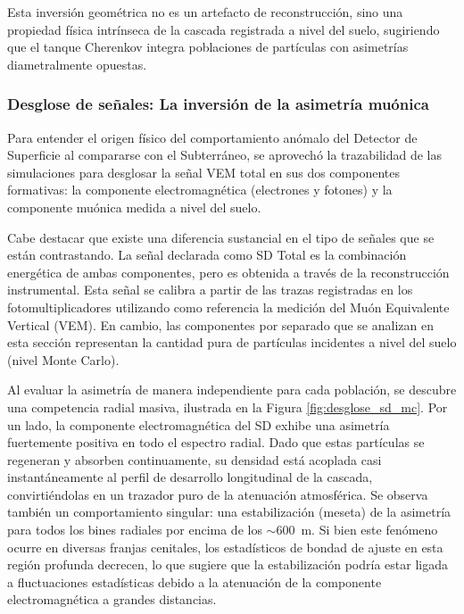 Esta inversión geométrica no es un artefacto de reconstrucción, sino una propiedad física intrínseca de la cascada registrada a nivel del suelo, sugiriendo que el tanque Cherenkov integra poblaciones de partículas con asimetrías diametralmente opuestas.

\subsubsection{Desglose de señales: La inversión de la asimetría muónica}
\label{subsubsec:desglose_sd}

Para entender el origen físico del comportamiento anómalo del Detector de Superficie al compararse con el Subterráneo, se aprovechó la trazabilidad de las simulaciones para desglosar la señal VEM total en sus dos componentes formativas: la componente electromagnética (electrones y fotones) y la componente muónica medida a nivel del suelo. 

Cabe destacar que existe una diferencia sustancial en el tipo de señales que se están contrastando. La señal declarada como SD Total es la combinación energética de ambas componentes, pero es obtenida a través de la reconstrucción instrumental. Esta señal se calibra a partir de las trazas registradas en los fotomultiplicadores utilizando como referencia la medición del Muón Equivalente Vertical (VEM). En cambio, las componentes por separado que se analizan en esta sección representan la cantidad pura de partículas incidentes a nivel del suelo (nivel Monte Carlo). 

Al evaluar la asimetría de manera independiente para cada población, se descubre una competencia radial masiva, ilustrada en la Figura \ref{fig:desglose_sd_mc}. Por un lado, la componente electromagnética del SD exhibe una asimetría fuertemente positiva en todo el espectro radial. Dado que estas partículas se regeneran y absorben continuamente, su densidad está acoplada casi instantáneamente al perfil de desarrollo longitudinal de la cascada, convirtiéndolas en un trazador puro de la atenuación atmosférica. Se observa también un comportamiento singular: una estabilización (meseta) de la asimetría para todos los bines radiales por encima de los $\sim 600$~m. Si bien este fenómeno ocurre en diversas franjas cenitales, los estadísticos de bondad de ajuste en esta región profunda decrecen, lo que sugiere que la estabilización podría estar ligada a fluctuaciones estadísticas debido a la atenuación de la componente electromagnética a grandes distancias.

